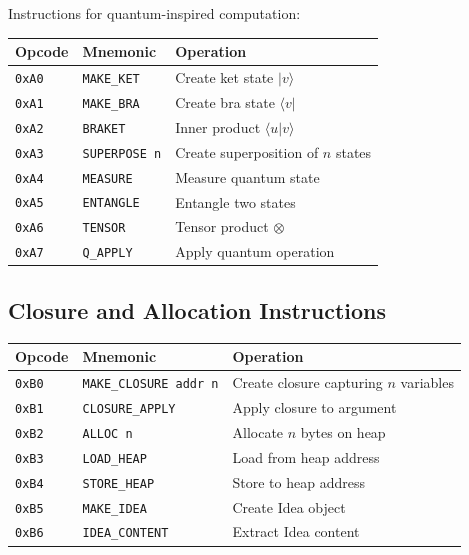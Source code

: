 \begin{definition}
\label{def:quantum-instructions}
Instructions for quantum-inspired computation:
\begin{center}
\begin{tabular}{llp{6.5cm}}
\toprule
\textbf{Opcode} & \textbf{Mnemonic} & \textbf{Operation} \\
\midrule
\texttt{0xA0} & \texttt{MAKE\_KET} & Create ket state $|v\rangle$ \\
\texttt{0xA1} & \texttt{MAKE\_BRA} & Create bra state $\langle v|$ \\
\texttt{0xA2} & \texttt{BRAKET} & Inner product $\langle u|v\rangle$ \\
\texttt{0xA3} & \texttt{SUPERPOSE n} & Create superposition of $n$ states \\
\texttt{0xA4} & \texttt{MEASURE} & Measure quantum state \\
\texttt{0xA5} & \texttt{ENTANGLE} & Entangle two states \\
\texttt{0xA6} & \texttt{TENSOR} & Tensor product $\otimes$ \\
\texttt{0xA7} & \texttt{Q\_APPLY} & Apply quantum operation \\
\bottomrule
\end{tabular}
\end{center}
\end{definition}

\subsection{Closure and Allocation Instructions}
\label{subsec:closure-instructions}

\begin{definition}
\label{def:closure-heap-instructions}
\begin{center}
\begin{tabular}{llp{6.5cm}}
\toprule
\textbf{Opcode} & \textbf{Mnemonic} & \textbf{Operation} \\
\midrule
\texttt{0xB0} & \texttt{MAKE\_CLOSURE addr n} & Create closure capturing $n$ variables \\
\texttt{0xB1} & \texttt{CLOSURE\_APPLY} & Apply closure to argument \\
\texttt{0xB2} & \texttt{ALLOC n} & Allocate $n$ bytes on heap \\
\texttt{0xB3} & \texttt{LOAD\_HEAP} & Load from heap address \\
\texttt{0xB4} & \texttt{STORE\_HEAP} & Store to heap address \\
\texttt{0xB5} & \texttt{MAKE\_IDEA} & Create Idea object \\
\texttt{0xB6} & \texttt{IDEA\_CONTENT} & Extract Idea content \\
\bottomrule
\end{tabular}
\end{center}
\end{definition}

